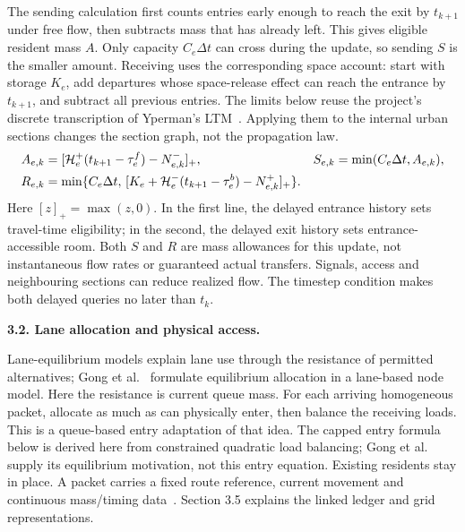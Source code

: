 \documentclass[10pt,a4paper]{article}
\newcommand{\pos}[1]{[#1]_+}
\newcommand{\rev}[1]{{\color{revisionred}#1}}
\begin{document}
The sending calculation first counts entries early enough to reach the
exit by $t_{k+1}$ under free flow, then subtracts mass that has already
left. This gives eligible resident mass $A$. Only capacity $C_e\Delta t$
can cross during the update, so sending $S$ is the smaller amount.
Receiving uses the corresponding space account: start with storage
$K_e$, add departures whose space-release effect can reach the entrance
by $t_{k+1}$, and subtract all previous entries.
\rev{The limits below reuse the project's discrete transcription of Yperman's LTM~\cite{m0}.}
Applying them to the internal urban sections changes the section graph,
not the propagation law.
\begin{align}
 A_{e,k}&=\pos{{\cal H}^+_e(t_{k+1}-\tau^f_e)-N^-_{e,k}},
 &S_{e,k}&=\min(C_e\Delta t,A_{e,k}),\label{eq:compact-sending}\\
 R_{e,k}&=\min\{C_e\Delta t,\,
 \pos{K_e+{\cal H}^-_e(t_{k+1}-\tau^b_e)-N^+_{e,k}}\}.
 \label{eq:compact-receiving}
\end{align}
Here $[z]_+=\max(z,0)$. In the first line, the delayed entrance history
sets travel-time eligibility; in the second, the delayed exit history
sets entrance-accessible room. Both $S$ and $R$ are mass allowances for
this update, not instantaneous flow rates or guaranteed actual transfers.
Signals, access and neighbouring sections can reduce realized flow.
The timestep condition makes both delayed queries no later than $t_k$.

\textbf{3.2. Lane allocation and physical access.}

Lane-equilibrium models explain lane use through the resistance of
permitted alternatives; \rev{Gong et al.~\cite{gong}} formulate equilibrium
allocation in a lane-based node model. Here the resistance is
current queue mass. For each arriving homogeneous packet, allocate as much
as can physically enter, then balance the receiving loads. This is a
queue-based entry adaptation of that idea.
\rev{The capped entry formula below is derived here from constrained quadratic load balancing; Gong et al.~\cite{gong} supply its equilibrium motivation, not this entry equation.} Existing residents stay in place. A packet carries a fixed
route reference, current movement and continuous mass/timing data~\cite{m1}.
Section 3.5 explains the linked ledger and grid representations.
\par
\end{document}
